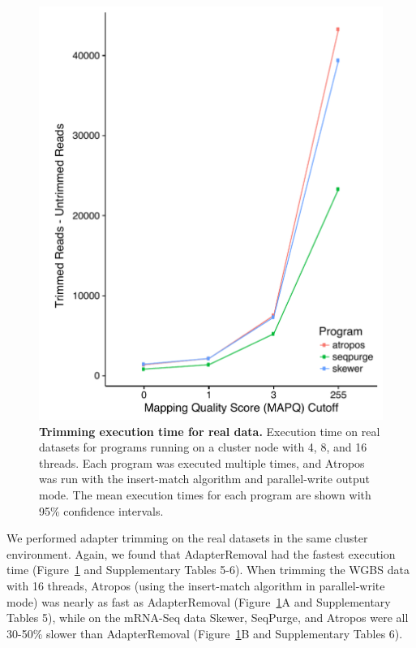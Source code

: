 \documentclass[fleqn,10pt,lineno]{wlpeerj} %
\begin{document}
\begin{figure}[!ht]
\centering
\includegraphics[width=\linewidth]{Figure3.pdf}
\caption{\textbf{Trimming execution time for real data.} Execution time on real datasets for programs running on a cluster node with 4, 8, and 16 threads. Each program was executed multiple times, and Atropos was run with the insert-match algorithm and parallel-write output mode. The mean execution times for each program are shown with 95\% confidence intervals.}
\label{fig:real-performance}
\end{figure}

We performed adapter trimming on the real datasets in the same cluster environment. Again, we found that AdapterRemoval had the fastest execution time (Figure~\ref{fig:real-performance} and Supplementary Tables 5-6). When trimming the WGBS data with 16 threads, Atropos (using the insert-match algorithm in parallel-write mode) was nearly as fast as AdapterRemoval (Figure~\ref{fig:real-performance}A and Supplementary Tables 5), while on the mRNA-Seq data Skewer, SeqPurge, and Atropos were all 30-50\% slower than AdapterRemoval (Figure~\ref{fig:real-performance}B and Supplementary Tables 6).
\end{document}
